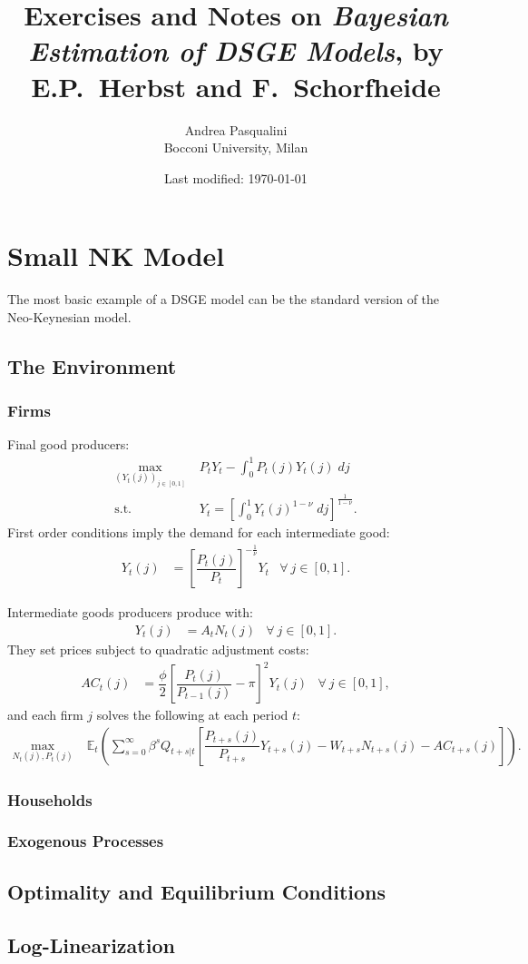 \documentclass[a4paper,11pt]{article}
\author{
	Andrea Pasqualini \\
	Bocconi University, Milan
}
\title{
	Exercises and Notes on \emph{Bayesian Estimation of DSGE Models}, by E.P.~Herbst and F.~Schorfheide
}
\date{Last modified: \today}
\newcommand{\E}{\mathbb{E}}
\begin{document}
\maketitle

\section{Small NK Model}
	The most basic example of a DSGE model can be the standard version of the Neo-Keynesian model.

	\subsection{The Environment}
		\subsubsection{Firms}
			Final good producers:
			\begin{align*}
				\max_{{(Y_t(j))}_{j\in[0,1]}} &\;
					P_t Y_t - \int_0^1 P_t(j) Y_t(j) \; dj \\
				\text{s.t.} &\;
					Y_t = {\left[ \int_0^1 {Y_t(j)}^{1-\nu} \; dj \right]}^{\frac{1}{1-\nu}}.
			\end{align*}
			First order conditions imply the demand for each intermediate good:
			\begin{align*}
				Y_t(j) &= {\left[ \dfrac{P_t(j)}{P_t} \right]}^{-\frac{1}{\nu}} Y_t & \forall\ j \in [0,1].
			\end{align*}

			Intermediate goods producers produce with:
			\begin{align*}
				Y_t(j) &= A_t N_t(j) & \forall\ j \in [0,1].
			\end{align*}
			They set prices subject to quadratic adjustment costs:
			\begin{align*}
				AC_t(j) &= \dfrac{\phi}{2} {\left[ \dfrac{P_t(j)}{P_{t-1}(j)} - \pi \right]}^2 Y_t(j) & \forall\ j \in [0,1],
			\end{align*}
			and each firm $j$ solves the following at each period $t$:
			\begin{align*}
				\max_{N_t(j), P_t(j)} &\;
					\E_t \left( \sum_{s=0}^{\infty} \beta^s Q_{t+s|t} \left[ \dfrac{P_{t+s}(j)}{P_{t+s}} Y_{t+s}(j) - W_{t+s} N_{t+s}(j) - AC_{t+s}(j) \right] \right).
			\end{align*}

		\subsubsection{Households}


		\subsubsection{Exogenous Processes}


	\subsection{Optimality and Equilibrium Conditions}


	\subsection{Log-Linearization}
\end{document}
